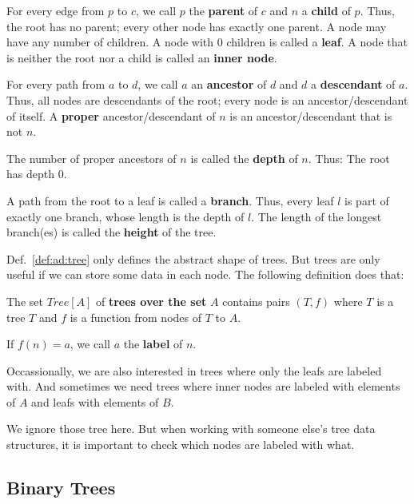 \begin{definition}\label{def:ad:treeaux}
For every edge from $p$ to $c$, we call $p$ the \textbf{parent} of $c$ and $n$ a \textbf{child} of $p$.
Thus, the root has no parent; every other node has exactly one parent.
A node may have any number of children.
A node with $0$ children is called a \textbf{leaf}.
A node that is neither the root nor a child is called an \textbf{inner node}.

For every path from $a$ to $d$, we call $a$ an \textbf{ancestor} of $d$ and $d$ a \textbf{descendant} of $a$.
Thus, all nodes are descendants of the root; every node is an ancestor/descendant of itself.
A \textbf{proper} ancestor/descendant of $n$ is an ancestor/descendant that is not $n$.

The number of proper ancestors of $n$ is called the \textbf{depth} of $n$.
Thus: The root has depth $0$.

A path from the root to a leaf is called a \textbf{branch}.
Thus, every leaf $l$ is part of exactly one branch, whose length is the depth of $l$.
The length of the longest branch(es) is called the \textbf{height} of the tree.
\end{definition}

Def.~\ref{def:ad:tree} only defines the abstract shape of trees.
But trees are only useful if we can store some data in each node.
The following definition does that:

\begin{definition}\label{def:ad:labeledtree}
The set $Tree[A]$ of \textbf{trees over the set} $A$ contains pairs $(T,f)$ where $T$ is a tree $T$ and $f$ is a function from nodes of $T$ to $A$.

If $f(n)=a$, we call $a$ the \textbf{label} of $n$.
\end{definition}

\begin{remark}
Occassionally, we are also interested in trees where only the leafs are labeled with.
And sometimes we need trees where inner nodes are labeled with elements of $A$ and leafs with elements of $B$.

We ignore those tree here.
But when working with someone else's tree data structures, it is important to check which nodes are labeled with what.
\end{remark}

\subsection{Binary Trees}

